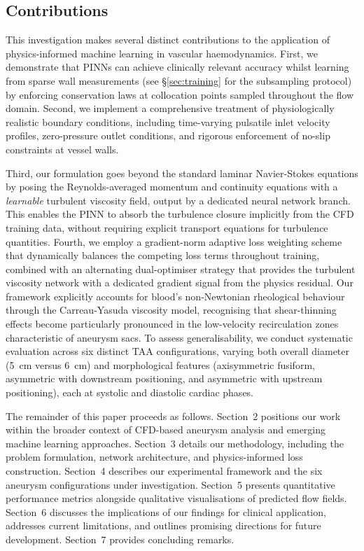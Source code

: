 \documentclass[11pt,a4paper]{article}
\begin{document}
\subsection{Contributions}

This investigation makes several distinct contributions to the application of physics-informed machine learning in vascular haemodynamics. First, we demonstrate that PINNs can achieve clinically relevant accuracy whilst learning from sparse wall measurements (see \S\ref{sec:training} for the subsampling protocol) by enforcing conservation laws at collocation points sampled throughout the flow domain. Second, we implement a comprehensive treatment of physiologically realistic boundary conditions, including time-varying pulsatile inlet velocity profiles, zero-pressure outlet conditions, and rigorous enforcement of no-slip constraints at vessel walls.

Third, our formulation goes beyond the standard laminar Navier-Stokes equations by posing the Reynolds-averaged momentum and continuity equations with a \emph{learnable} turbulent viscosity field, output by a dedicated neural network branch. This enables the PINN to absorb the turbulence closure implicitly from the CFD training data, without requiring explicit transport equations for turbulence quantities. Fourth, we employ a gradient-norm adaptive loss weighting scheme \cite{ref_wang2021} that dynamically balances the competing loss terms throughout training, combined with an alternating dual-optimiser strategy that provides the turbulent viscosity network with a dedicated gradient signal from the physics residual. Our framework explicitly accounts for blood's non-Newtonian rheological behaviour through the Carreau-Yasuda viscosity model, recognising that shear-thinning effects become particularly pronounced in the low-velocity recirculation zones characteristic of aneurysm sacs. To assess generalisability, we conduct systematic evaluation across six distinct TAA configurations, varying both overall diameter (5~cm versus 6~cm) and morphological features (axisymmetric fusiform, asymmetric with downstream positioning, and asymmetric with upstream positioning), each at systolic and diastolic cardiac phases.

The remainder of this paper proceeds as follows. Section~2 positions our work within the broader context of CFD-based aneurysm analysis and emerging machine learning approaches. Section~3 details our methodology, including the problem formulation, network architecture, and physics-informed loss construction. Section~4 describes our experimental framework and the six aneurysm configurations under investigation. Section~5 presents quantitative performance metrics alongside qualitative visualisations of predicted flow fields. Section~6 discusses the implications of our findings for clinical application, addresses current limitations, and outlines promising directions for future development. Section~7 provides concluding remarks.
\end{document}
